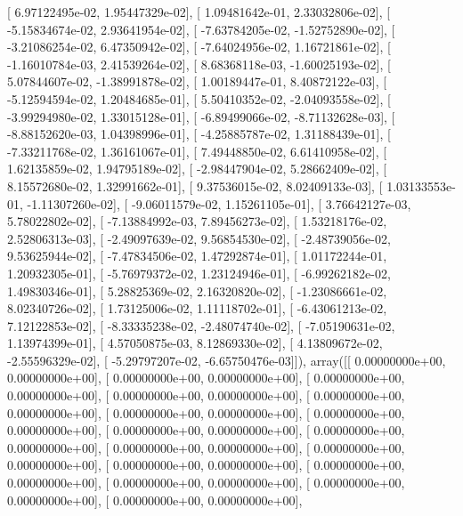\documentclass{article}
\begin{document}
       [  6.97122495e-02,   1.95447329e-02],
       [  1.09481642e-01,   2.33032806e-02],
       [ -5.15834674e-02,   2.93641954e-02],
       [ -7.63784205e-02,  -1.52752890e-02],
       [ -3.21086254e-02,   6.47350942e-02],
       [ -7.64024956e-02,   1.16721861e-02],
       [ -1.16010784e-03,   2.41539264e-02],
       [  8.68368118e-03,  -1.60025193e-02],
       [  5.07844607e-02,  -1.38991878e-02],
       [  1.00189447e-01,   8.40872122e-03],
       [ -5.12594594e-02,   1.20484685e-01],
       [  5.50410352e-02,  -2.04093558e-02],
       [ -3.99294980e-02,   1.33015128e-01],
       [ -6.89499066e-02,  -8.71132628e-03],
       [ -8.88152620e-03,   1.04398996e-01],
       [ -4.25885787e-02,   1.31188439e-01],
       [ -7.33211768e-02,   1.36161067e-01],
       [  7.49448850e-02,   6.61410958e-02],
       [  1.62135859e-02,   1.94795189e-02],
       [ -2.98447904e-02,   5.28662409e-02],
       [  8.15572680e-02,   1.32991662e-01],
       [  9.37536015e-02,   8.02409133e-03],
       [  1.03133553e-01,  -1.11307260e-02],
       [ -9.06011579e-02,   1.15261105e-01],
       [  3.76642127e-03,   5.78022802e-02],
       [ -7.13884992e-03,   7.89456273e-02],
       [  1.53218176e-02,   2.52806313e-03],
       [ -2.49097639e-02,   9.56854530e-02],
       [ -2.48739056e-02,   9.53625944e-02],
       [ -7.47834506e-02,   1.47292874e-01],
       [  1.01172244e-01,   1.20932305e-01],
       [ -5.76979372e-02,   1.23124946e-01],
       [ -6.99262182e-02,   1.49830346e-01],
       [  5.28825369e-02,   2.16320820e-02],
       [ -1.23086661e-02,   8.02340726e-02],
       [  1.73125006e-02,   1.11118702e-01],
       [ -6.43061213e-02,   7.12122853e-02],
       [ -8.33335238e-02,  -2.48074740e-02],
       [ -7.05190631e-02,   1.13974399e-01],
       [  4.57050875e-03,   8.12869330e-02],
       [  4.13809672e-02,  -2.55596329e-02],
       [ -5.29797207e-02,  -6.65750476e-03]]), array([[  0.00000000e+00,   0.00000000e+00],
       [  0.00000000e+00,   0.00000000e+00],
       [  0.00000000e+00,   0.00000000e+00],
       [  0.00000000e+00,   0.00000000e+00],
       [  0.00000000e+00,   0.00000000e+00],
       [  0.00000000e+00,   0.00000000e+00],
       [  0.00000000e+00,   0.00000000e+00],
       [  0.00000000e+00,   0.00000000e+00],
       [  0.00000000e+00,   0.00000000e+00],
       [  0.00000000e+00,   0.00000000e+00],
       [  0.00000000e+00,   0.00000000e+00],
       [  0.00000000e+00,   0.00000000e+00],
       [  0.00000000e+00,   0.00000000e+00],
       [  0.00000000e+00,   0.00000000e+00],
       [  0.00000000e+00,   0.00000000e+00],
       [  0.00000000e+00,   0.00000000e+00],
\end{document}
